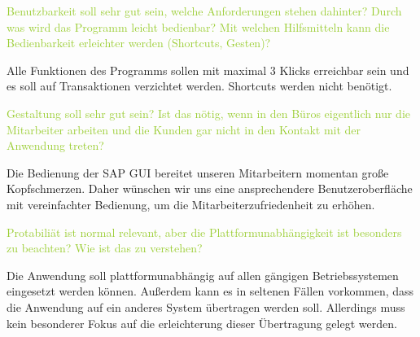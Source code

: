 \textcolor{YellowGreen}{Benutzbarkeit soll sehr gut sein, welche Anforderungen stehen dahinter? Durch was wird das Programm leicht bedienbar? Mit welchen Hilfsmitteln kann die Bedienbarkeit erleichter werden (Shortcuts, Gesten)?}

\textcolor{NavyBlue}{Alle Funktionen des Programms sollen mit maximal 3 Klicks erreichbar sein und es soll auf Transaktionen verzichtet werden. Shortcuts werden nicht benötigt.}


\textcolor{YellowGreen}{Gestaltung soll sehr gut sein? Ist das nötig, wenn in den Büros eigentlich nur die Mitarbeiter arbeiten und die Kunden gar nicht in den Kontakt mit der Anwendung treten?}

\textcolor{NavyBlue}{Die Bedienung der SAP GUI bereitet unseren Mitarbeitern momentan große Kopfschmerzen. Daher wünschen wir uns eine ansprechendere Benutzeroberfläche mit vereinfachter Bedienung, um die Mitarbeiterzufriedenheit zu erhöhen.}


\textcolor{YellowGreen}{Protabiliät ist normal relevant, aber die Plattformunabhängigkeit ist besonders zu beachten? Wie ist das zu verstehen?}

\textcolor{NavyBlue}{Die Anwendung soll plattformunabhängig auf allen gängigen Betriebssystemen eingesetzt werden können. Außerdem kann es in seltenen Fällen vorkommen, dass die Anwendung auf ein anderes System übertragen werden soll. Allerdings muss kein besonderer Fokus auf die erleichterung dieser Übertragung gelegt werden.}